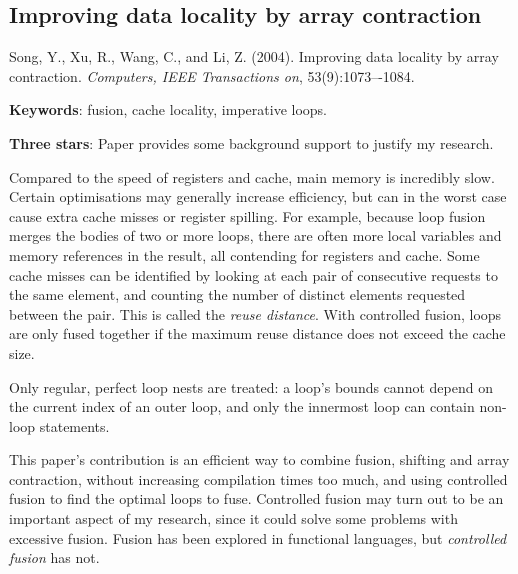 \documentclass[12pt,a4paper]{article}
\begin{document}
\subsection{Improving data locality by array contraction}
\cite{song2004improving}
Song, Y., Xu, R., Wang, C., and Li, Z. (2004). Improving data locality by array contraction. \emph{Computers, IEEE Transactions on}, 53(9):1073–-1084.

{\bf Keywords}: fusion, cache locality, imperative loops.

{\bf Three stars}: Paper provides some background support to justify my research.


Compared to the speed of registers and cache, main memory is incredibly slow.
Certain optimisations may generally increase efficiency, but can in the worst case cause extra cache misses or register spilling.
For example, because loop fusion merges the bodies of two or more loops, there are often more local variables
and memory references in the result, all contending for registers and cache.
Some cache misses can be identified by looking at each pair of consecutive requests to the same element, and counting the number of distinct elements requested between the pair.
This is called the \emph{reuse distance}.
With controlled fusion, loops are only fused together if the maximum reuse distance does not exceed the cache size. 

Only regular, perfect loop nests are treated: a loop's bounds cannot depend on the current index of an outer loop,
and only the innermost loop can contain non-loop statements.

This paper's contribution is an efficient way to combine fusion, shifting and array contraction,
without increasing compilation times too much, and using controlled fusion to find the optimal loops to fuse.
Controlled fusion may turn out to be an important aspect of my research,
since it could solve some problems with excessive fusion.
Fusion has been explored in functional languages, but \emph{controlled fusion} has not.



\pagebreak
{}
\nocite{*}


\end{document}
